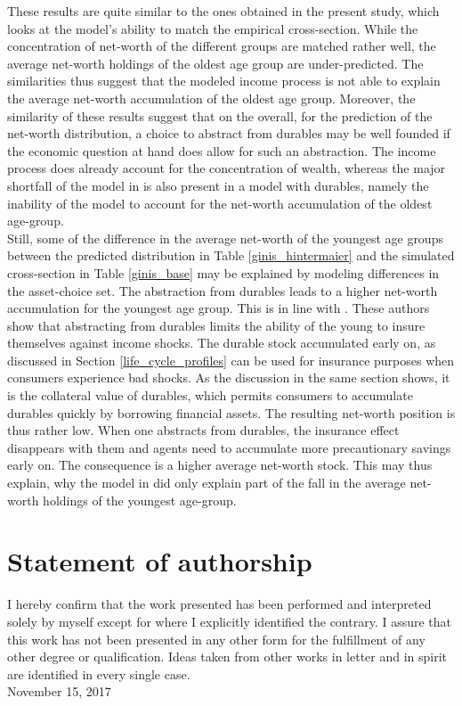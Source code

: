 \documentclass[a4paper,12pt,legno]{article}
\begin{document}
These results are quite similar to the ones obtained in the present study, which looks at the model's ability to match the empirical cross-section. While the concentration of net-worth of the different groups are matched rather well, the average net-worth holdings of the oldest age group are under-predicted. The similarities thus suggest that the modeled income process is not able to explain the average net-worth accumulation of the oldest age group. Moreover, the similarity of these results suggest that on the overall, for the prediction of the net-worth distribution, a choice to abstract from durables may be well founded if the economic question at hand does allow for such an abstraction. The income process does already account for the concentration of wealth, whereas the major shortfall of the model in \cite{hintermaier2011} is also present in a model with durables, namely the inability of the model to account for the net-worth accumulation of the oldest age-group.\\
Still, some of the difference in the average net-worth of the youngest age groups between the predicted distribution in Table \ref{ginis_hintermaier} and the simulated cross-section in Table \ref{ginis_base} may be explained by modeling differences in the asset-choice set. The abstraction from durables leads to a higher net-worth accumulation for the youngest age group. This is in line with \cite{FV&K2011}. These authors show that abstracting from durables limits the ability of the young to insure themselves against income shocks. The durable stock accumulated early on, as discussed in Section \ref{life_cycle_profiles} can be used for insurance purposes when consumers experience bad shocks. As the discussion in the same section shows, it is the collateral value of durables, which permits consumers to accumulate durables quickly by borrowing financial assets. The resulting net-worth position is thus rather low. When one abstracts from durables, the insurance effect disappears with them and agents need to accumulate more precautionary savings early on. The consequence is a higher average net-worth stock. This may thus explain, why the model in \cite{hintermaier2011} did only explain part of the fall in the average net-worth holdings of the youngest age-group. 

\newpage

\section*{Statement of authorship}
I hereby confirm that the work presented has been performed and interpreted solely by myself except for where I explicitly identified the contrary. I assure that this work has not been presented in any other form for the fulfillment of any other degree or qualification. Ideas taken from other works in letter and in spirit are identified in every single case.
\\[1in] November 15, 2017
\end{document}
